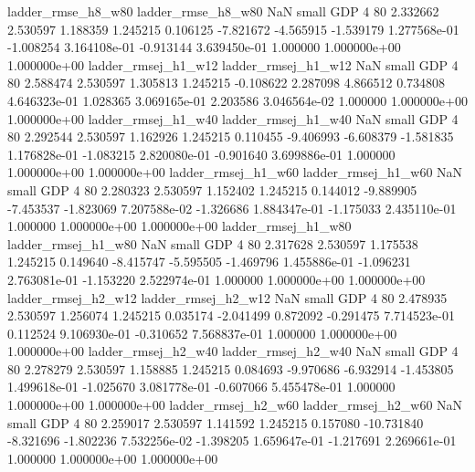       ladder_rmse_h8_w80       ladder_rmse_h8_w80                   NaN      small      GDP                 4 80 2.332662       2.530597 1.188359       1.245215    0.106125     -7.821672     -4.565915    -1.539179   1.277568e-01 -1.008254 3.164108e-01    -0.913144   3.639450e-01            1.000000    1.000000e+00        1.000000e+00
     ladder_rmsej_h1_w12      ladder_rmsej_h1_w12                   NaN      small      GDP                 4 80 2.588474       2.530597 1.305813       1.245215   -0.108622      2.287098      4.866512     0.734808   4.646323e-01  1.028365 3.069165e-01     2.203586   3.046564e-02            1.000000    1.000000e+00        1.000000e+00
     ladder_rmsej_h1_w40      ladder_rmsej_h1_w40                   NaN      small      GDP                 4 80 2.292544       2.530597 1.162926       1.245215    0.110455     -9.406993     -6.608379    -1.581835   1.176828e-01 -1.083215 2.820080e-01    -0.901640   3.699886e-01            1.000000    1.000000e+00        1.000000e+00
     ladder_rmsej_h1_w60      ladder_rmsej_h1_w60                   NaN      small      GDP                 4 80 2.280323       2.530597 1.152402       1.245215    0.144012     -9.889905     -7.453537    -1.823069   7.207588e-02 -1.326686 1.884347e-01    -1.175033   2.435110e-01            1.000000    1.000000e+00        1.000000e+00
     ladder_rmsej_h1_w80      ladder_rmsej_h1_w80                   NaN      small      GDP                 4 80 2.317628       2.530597 1.175538       1.245215    0.149640     -8.415747     -5.595505    -1.469796   1.455886e-01 -1.096231 2.763081e-01    -1.153220   2.522974e-01            1.000000    1.000000e+00        1.000000e+00
     ladder_rmsej_h2_w12      ladder_rmsej_h2_w12                   NaN      small      GDP                 4 80 2.478935       2.530597 1.256074       1.245215    0.035174     -2.041499      0.872092    -0.291475   7.714523e-01  0.112524 9.106930e-01    -0.310652   7.568837e-01            1.000000    1.000000e+00        1.000000e+00
     ladder_rmsej_h2_w40      ladder_rmsej_h2_w40                   NaN      small      GDP                 4 80 2.278279       2.530597 1.158885       1.245215    0.084693     -9.970686     -6.932914    -1.453805   1.499618e-01 -1.025670 3.081778e-01    -0.607066   5.455478e-01            1.000000    1.000000e+00        1.000000e+00
     ladder_rmsej_h2_w60      ladder_rmsej_h2_w60                   NaN      small      GDP                 4 80 2.259017       2.530597 1.141592       1.245215    0.157080    -10.731840     -8.321696    -1.802236   7.532256e-02 -1.398205 1.659647e-01    -1.217691   2.269661e-01            1.000000    1.000000e+00        1.000000e+00
